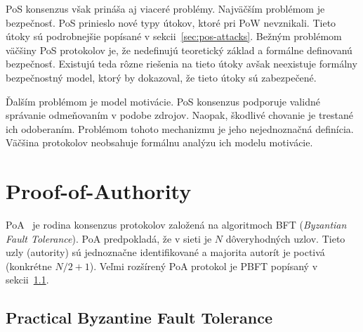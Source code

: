 PoS konsenzus však prináša aj viaceré problémy. Najväčším problémom je bezpečnosť. PoS prinieslo nové typy útokov, ktoré pri PoW nevznikali. Tieto útoky sú podrobnejšie popísané v sekcii~\ref{sec:pos-attacks}. Bežným problémom väčšiny PoS protokolov je, že nedefinujú teoretický základ a formálne definovanú bezpečnosť. Existujú teda rôzne riešenia na tieto útoky avšak neexistuje formálny bezpečnostný model, ktorý by dokazoval, že tieto útoky sú zabezpečené.

Ďalším problémom je model motivácie. PoS konsenzus podporuje validné správanie odmeňovaním v podobe zdrojov. Naopak, škodlivé chovanie je trestané ich odoberaním. Problémom tohoto mechanizmu je jeho nejednoznačná definícia. Väčšina protokolov neobsahuje formálnu analýzu ich modelu motivácie.~\cite{nguyenPos}

\section{Proof-of-Authority}

PoA~\cite{Angelis2018PBFTVP} je rodina konsenzus protokolov založená na algoritmoch BFT (\textit{Byzantian Fault Tolerance}). PoA predpokladá, že v sieti je $N$ dôveryhodných uzlov. Tieto uzly (autority) sú jednoznačne identifikované  a majorita autorít je poctivá (konkrétne $N/2 + 1$). Veľmi rozšírený PoA protokol je PBFT popísaný v sekcii~\ref{subsec:pos-pbft}.

\subsection{Practical Byzantine Fault Tolerance}\label{subsec:pos-pbft}

